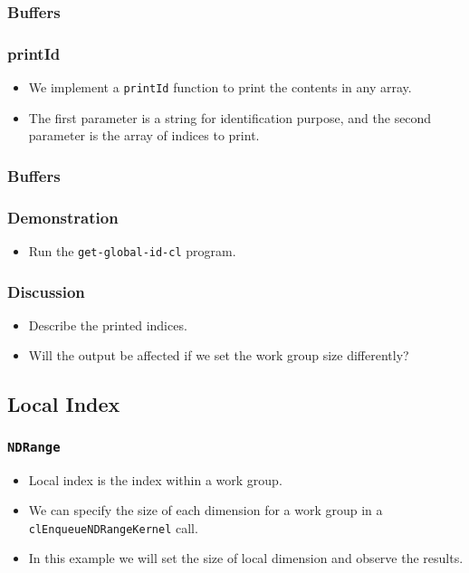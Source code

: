 \documentclass{beamer}
\begin{document}
\begin{frame}
  \frametitle{Buffers}
\end{frame}

\begin{frame}
  \frametitle{printId}
  \begin{itemize}
    \item We implement a {\tt printId} function to print the contents
      in any array.
    \item The first parameter is a string for identification purpose,
      and the second parameter is the array of indices to print.
  \end{itemize}
\end{frame}

\begin{frame}
  \frametitle{Buffers}
\end{frame}

\begin{frame}
  \frametitle{Demonstration}
  \begin{itemize}
    \item Run the {\tt get-global-id-cl} program.
  \end{itemize}
\end{frame}

\begin{frame}
  \frametitle{Discussion}
  \begin{itemize}
  \item Describe the printed indices.
  \item Will the output be affected if we set the work group size
    differently?
  \end{itemize}
\end{frame}

\subsection{Local Index}

\begin{frame}
  \frametitle{\tt NDRange} 
  \begin{itemize}
    \item Local index is the index within a work group.
    \item We can specify the size of each dimension for a work group
      in a {\tt clEnqueueNDRangeKernel} call.
    \item In this example we will set the size of local dimension and
      observe the results.
  \end{itemize}
\end{frame}
\end{document}
